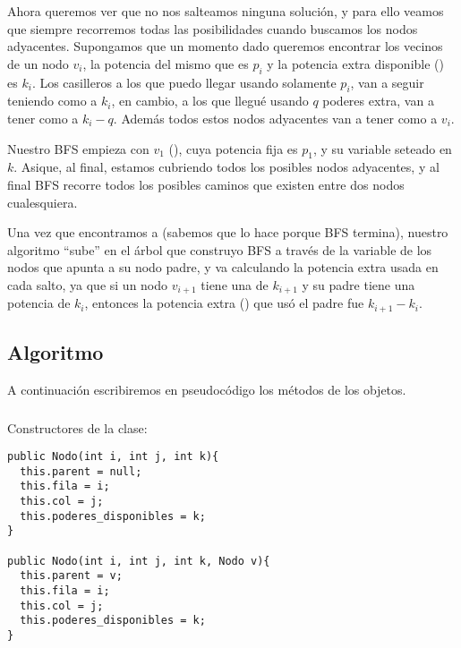 Ahora queremos ver que no nos salteamos ninguna soluci\'on, y para ello veamos que siempre recorremos todas las posibilidades cuando buscamos los nodos adyacentes. Supongamos que un momento dado queremos encontrar los vecinos de un nodo $v_i$, la potencia del mismo que es $p_i$ y la potencia extra disponible () es $k_i$. Los casilleros a los que puedo llegar usando solamente $p_i$, van a seguir teniendo como  a $k_i$, en cambio, a los que llegu\'e usando $q$ poderes extra, van a tener como  a $k_i-q$. Adem\'as todos estos nodos adyacentes van a tener como  a $v_i$. 

Nuestro BFS empieza con $v_1$ (), cuya potencia fija es $p_1$, y su variable  seteado en $k$. Asique, al final, estamos cubriendo todos los posibles nodos adyacentes, y al final BFS recorre todos los posibles caminos que existen entre dos nodos cualesquiera. 

Una vez que encontramos a  (sabemos que lo hace porque BFS termina), nuestro algoritmo ``sube'' en el \'arbol que construyo BFS a trav\'es de la variable de los nodos  que apunta a su nodo padre, y va calculando la potencia extra usada en cada salto, ya que si un nodo $v_{i+1}$ tiene una  de $k_{i+1}$ y su padre tiene una potencia de $k_i$, entonces la potencia extra () que us\'o el padre fue $k_{i+1} - k_i$.

\subsection{Algoritmo}

A continuaci\'on escribiremos en pseudoc\'odigo los m\'etodos de los objetos. 

\subsubsection{}

Constructores de la clase: 

\begin{verbatim}
public Nodo(int i, int j, int k){
  this.parent = null;
  this.fila = i; 
  this.col = j; 
  this.poderes_disponibles = k;
}

public Nodo(int i, int j, int k, Nodo v){
  this.parent = v;
  this.fila = i; 
  this.col = j; 
  this.poderes_disponibles = k;
}
\end{verbatim}

